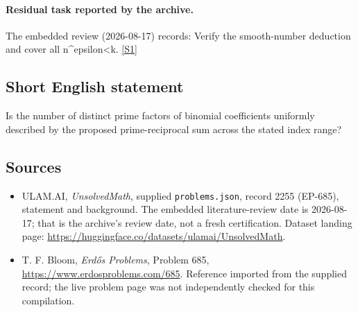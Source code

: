\documentclass[11pt,a4paper]{article}
\newcommand{\sref}[2]{\hyperlink{source:#1:#2}{[S#2]}}
\begin{document}
\paragraph{Residual task reported by the archive.}

The embedded review (2026-08-17) records: Verify the smooth-number deduction and cover all n\textasciicircum{}epsilon<k. \sref{2255}{1}

\subsection{Short English statement}

Is the number of distinct prime factors of binomial coefficients uniformly described by the proposed prime-reciprocal sum across the stated index range?

\subsection{Sources}

{\small

\begin{itemize}

\item[\hypertarget{source:2255:1}{S1}] ULAM.AI, \emph{UnsolvedMath}, supplied \texttt{problems.json}, record 2255 (EP-685), statement and background. The embedded literature-review date is 2026-08-17; that is the archive’s review date, not a fresh certification. Dataset landing page: \url{https://huggingface.co/datasets/ulamai/UnsolvedMath}.

\item[\hypertarget{source:2255:2}{S2}] T. F. Bloom, \emph{Erdős Problems}, Problem 685, \url{https://www.erdosproblems.com/685}. Reference imported from the supplied record; the live problem page was not independently checked for this compilation.

\end{itemize}

}

\label{end:2255}
\end{document}
